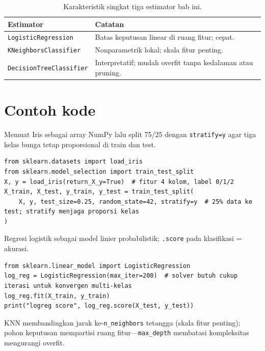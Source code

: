 \documentclass[../main.tex]{subfiles}
\begin{document}
\begin{table}[htbp]
\centering
\caption{Karakteristik singkat tiga estimator bab ini.}
\label{tab:classifier-band}
\begin{tabular}{@{}>{\raggedright\arraybackslash}p{5.05cm}p{7.65cm}@{}}
\toprule
\textbf{Estimator} & \textbf{Catatan} \\
\midrule
\texttt{LogisticRegression} & Batas keputusan linear di ruang fitur; cepat. \\
\texttt{KNeighborsClassifier} & Nonparametrik lokal; skala fitur penting. \\
\texttt{DecisionTreeClassifier} & Interpretatif; mudah overfit tanpa kedalaman atau pruning. \\
\bottomrule
\end{tabular}
\end{table}

\section{Contoh kode}

\MulaiPenjelasanKode Memuat Iris sebagai array NumPy lalu split 75/25 dengan \texttt{stratify=y} agar tiga kelas bunga tetap proporsional di train dan test. \SelesaiPenjelasanKode

\begin{lstlisting}[caption=Data dan split (Iris)]
from sklearn.datasets import load_iris
from sklearn.model_selection import train_test_split
X, y = load_iris(return_X_y=True)  # fitur 4 kolom, label 0/1/2
X_train, X_test, y_train, y_test = train_test_split(
    X, y, test_size=0.25, random_state=42, stratify=y  # 25% data ke test; stratify menjaga proporsi kelas
)
\end{lstlisting}

\MulaiPenjelasanKode Regresi logistik sebagai model linier probabilistik; \texttt{.score} pada klasifikasi = akurasi. \SelesaiPenjelasanKode

\begin{lstlisting}[caption=LogisticRegression]
from sklearn.linear_model import LogisticRegression
log_reg = LogisticRegression(max_iter=200)  # solver butuh cukup iterasi untuk konvergen multi-kelas
log_reg.fit(X_train, y_train)
print("logreg score", log_reg.score(X_test, y_test))
\end{lstlisting}

\MulaiPenjelasanKode KNN membandingkan jarak ke-\texttt{n\_neighbors} tetangga (skala fitur penting); pohon keputusan mempartisi ruang fitur---\texttt{max\_depth} membatasi kompleksitas mengurangi overfit. \SelesaiPenjelasanKode
\end{document}
